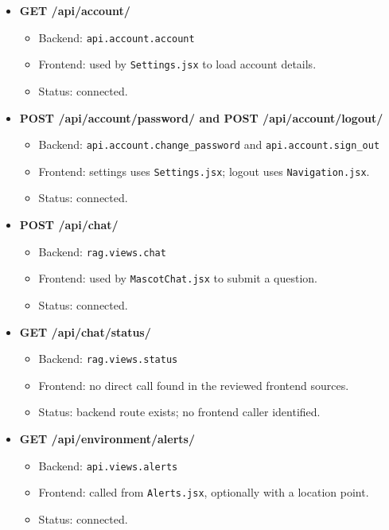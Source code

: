 \documentclass[11pt]{article}
\begin{document}
\begin{itemize}[leftmargin=1.5em, itemsep=0.55em]
\item \textbf{GET /api/account/}
  \begin{itemize}[leftmargin=1.5em, itemsep=0.2em]
    \item Backend: \texttt{api.account.account}
    \item Frontend: used by \texttt{Settings.jsx} to load account details.
    \item Status: connected.
  \end{itemize}

\item \textbf{POST /api/account/password/ and POST /api/account/logout/}
  \begin{itemize}[leftmargin=1.5em, itemsep=0.2em]
    \item Backend: \texttt{api.account.change\_password} and \texttt{api.account.sign\_out}
    \item Frontend: settings uses \texttt{Settings.jsx}; logout uses \texttt{Navigation.jsx}.
    \item Status: connected.
  \end{itemize}

\item \textbf{POST /api/chat/}
  \begin{itemize}[leftmargin=1.5em, itemsep=0.2em]
    \item Backend: \texttt{rag.views.chat}
    \item Frontend: used by \texttt{MascotChat.jsx} to submit a question.
    \item Status: connected.
  \end{itemize}

\item \textbf{GET /api/chat/status/}
  \begin{itemize}[leftmargin=1.5em, itemsep=0.2em]
    \item Backend: \texttt{rag.views.status}
    \item Frontend: no direct call found in the reviewed frontend sources.
    \item Status: backend route exists; no frontend caller identified.
  \end{itemize}

\item \textbf{GET /api/environment/alerts/}
  \begin{itemize}[leftmargin=1.5em, itemsep=0.2em]
    \item Backend: \texttt{api.views.alerts}
    \item Frontend: called from \texttt{Alerts.jsx}, optionally with a location point.
    \item Status: connected.
  \end{itemize}


\end{itemize}
\end{document}
